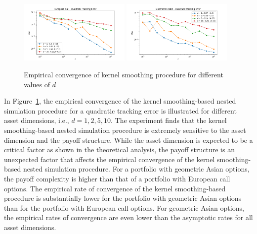 \begin{figure}[ht!]
    \centering
    \includegraphics[width=0.48\textwidth]{./project1/figures/figure4a.png}
    \includegraphics[width=0.48\textwidth]{./project1/figures/figure4b.png}
    \caption{Empirical convergence of kernel smoothing procedure for different values of $d$}
\label{fig1:kernel_d} 
\end{figure}

In Figure~\ref{fig1:kernel_d}, the empirical convergence of the kernel smoothing-based nested simulation procedure for a quadratic tracking error is illustrated for different asset dimensions, i.e., $d = 1, 2, 5, 10$.
The experiment finds that the kernel smoothing-based nested simulation procedure is extremely sensitive to the asset dimension and the payoff structure.
While the asset dimension is expected to be a critical factor as shown in the theoretical analysis, the payoff structure is an unexpected factor that affects the empirical convergence of the kernel smoothing-based nested simulation procedure.
For a portfolio with geometric Asian options, the payoff complexity is higher than that of a portfolio with European call options.
The empirical rate of convergence of the kernel smoothing-based procedure is substantially lower for the portfolio with geometric Asian options than for the portfolio with European call options.
For geometric Asian options, the empirical rates of convergence are even lower than the asymptotic rates for all asset dimensions.


